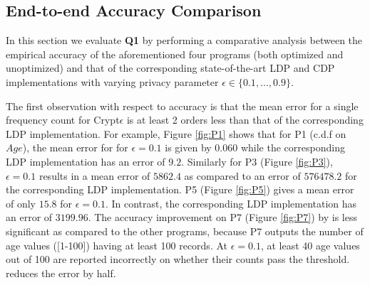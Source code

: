 \subsection{End-to-end Accuracy Comparison}
In this section we evaluate \textbf{Q1} by performing a comparative analysis between the empirical accuracy of the aforementioned four \system programs (both optimized and unoptimized) and that of the corresponding state-of-the-art \textsf{LDP} \cite{LDP1} and \textsf{CDP} \cite{Dork} implementations  with varying privacy parameter $\epsilon \in \{0.1,...,0.9\}$. %

The first observation with respect to accuracy is that the mean error for a single frequency count for Crypt$\epsilon$ is at least 2 orders less than that of the corresponding \textsf{LDP} implementation.   For example, Figure \ref{fig:P1} shows that for P1 (c.d.f on $Age$), the mean error for \system for $\epsilon=0.1$ is given by $0.060$ while the corresponding \textsf{LDP} implementation has an error of $9.2$. Similarly for P3 (Figure \ref{fig:P3}),  $\epsilon=0.1$ results in a mean error of $5862.4$ as compared to an error of $576478.2$ for the corresponding \textsf{LDP} implementation. P5 (Figure \ref{fig:P5}) gives a mean error of only $15.8$ for $\epsilon=0.1$. In contrast, the corresponding \textsf{LDP} implementation has an error of $3199.96$.   The accuracy improvement on P7 (Figure \ref{fig:P7}) by \system is less significant as compared to the other programs, because P7 outputs the number of age values ([1-100]) having at least 100 records. At $\epsilon=0.1$, at least 40 age values out of 100 are
reported incorrectly on whether their counts pass the threshold. \system reduces the error by half. 

